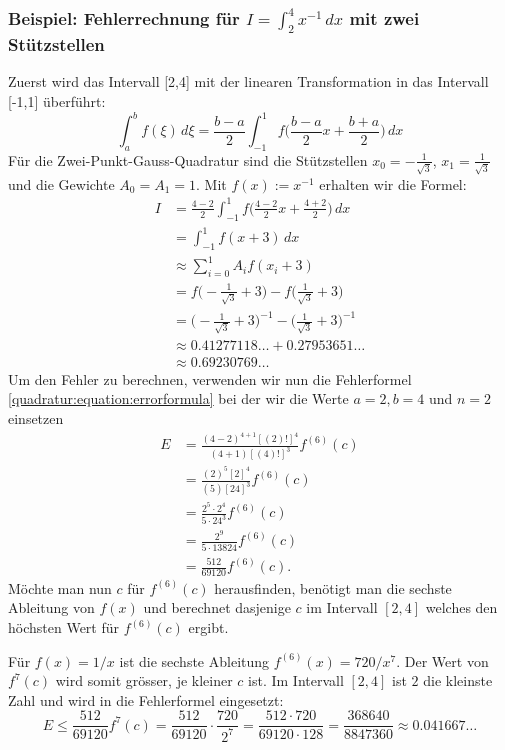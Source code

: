 \subsubsection{Beispiel: Fehlerrechnung für $I = \int_{2}^{4}x^{-1}\,dx$ mit zwei Stützstellen}
Zuerst wird das Intervall [2,4] mit der linearen Transformation in das Intervall [-1,1] überführt:
\begin{equation}
    \int_{a}^{b} f(\xi)\,d\xi = \frac{b-a}{2}\int_{-1}^{1} f \bigg( \frac{b-a}{2} x + \frac{b+a}{2} \bigg) \,dx
\end{equation}
Für die Zwei-Punkt-Gauss-Quadratur sind die Stützstellen 
$x_{0}= -\frac{1}{\sqrt{3}}$, $x_{1} = \frac{1}{\sqrt{3}}$ 
und die Gewichte $A_{0} = A_{1} = 1$. Mit $f(x) := x^{-1}$ 
erhalten wir die Formel:
\begin{align}
    I &= \frac{4-2}{2} \int_{-1}^{1} f \bigg( \frac{4-2}{2} x + \frac{4+2}{2} \bigg) \,dx
    \\
    &= \int_{-1}^{1} f (x + 3)\,dx 
    \\
    &\approx \sum_{i=0}^{1} A_{i} f(x_{i} + 3)
    \\
    &= f\bigg(-\frac{1}{\sqrt{3}}+3\bigg)
    -
    f\bigg(\frac{1}{\sqrt{3}}+3\bigg)
    \\
    &= \bigg(-\frac{1}{\sqrt{3}}+3\bigg)^{-1} 
    - 
    \bigg(\frac{1}{\sqrt{3}}+3\bigg)^{-1}
    \\
    &\approx 0.41277118\dots + 0.27953651\dots
    \\
    &\approx 0.69230769\dots
\end{align}
Um den Fehler zu berechnen, verwenden wir nun die Fehlerformel \ref{quadratur:equation:errorformula}
bei der wir die Werte $a = 2, b = 4$ und $n = 2$ einsetzen
\begin{align}
    E &= \frac{(4-2)^{4+1}[(2)!]^{4}}{(4+1)[(4)!]^{3}}f^{(6)}(c)
    \\
    &= \frac{(2)^{5}[2]^{4}}{(5)[24]^{3}}f^{(6)}(c)
    \\
    &= \frac{2^{5} \cdot 2^{4}}{5 \cdot 24^{3}}f^{(6)}(c)
    \\
    &= \frac{2^{9} }{5 \cdot 13824}f^{(6)}(c)
    \\
    &= \frac{512}{69120}f^{(6)}(c).
\end{align}
Möchte man nun $c$ für $f^{(6)}(c)$ herausfinden, benötigt man die 
sechste Ableitung von $f(x)$ und berechnet dasjenige $c$ im Intervall $[2, 4]$ 
welches den höchsten Wert für $f^{(6)}(c)$ ergibt.

Für $f(x) = 1/x$ ist die sechste Ableitung $f^{(6)}(x) = 720/x^{7}$. 
Der Wert von $f^{7}(c)$ wird somit grösser, je kleiner $c$ ist.
Im Intervall $[2,4]$ ist $2$ die kleinste Zahl und wird in die Fehlerformel eingesetzt:
\begin{equation}
    E \leq \frac{512}{69120}f^{7}(c) = \frac{512}{69120} \cdot \frac{720}{2^{7}} = \frac{512 \cdot 720}{69120 \cdot 128} = \frac{368640}{8847360}\approx 0.041667\dots
\end{equation}



